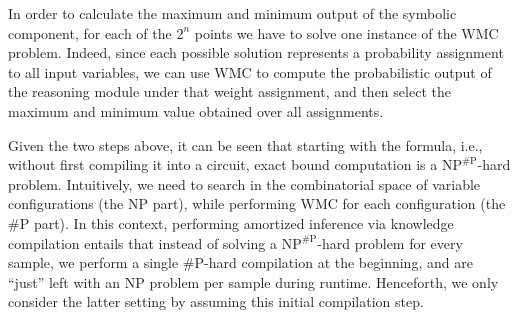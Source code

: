 In order to calculate the maximum and minimum output of the symbolic component, for each of the $2^n$ points we have to solve one instance of the WMC problem. Indeed, since each possible solution represents a probability assignment to all input variables, we can use WMC to compute the probabilistic output of the reasoning module under that weight assignment, and then select the maximum and minimum value obtained over all assignments.

Given the two steps above, it can be seen that starting with the formula, i.e., without first compiling it into a circuit, exact bound computation is a $\mathrm{NP}^{\# \mathrm{P}}$-hard problem. Intuitively, we need to search in the combinatorial space of variable configurations (the $\mathrm{NP}$ part), while performing WMC for each configuration (the $\# \mathrm{P}$ part). In this context, performing amortized inference via knowledge compilation entails that instead of solving a $\mathrm{NP}^{\# \mathrm{P}}$-hard problem for every sample, we perform a single $\# \mathrm{P}$-hard compilation at the beginning, and are ``just'' left with an NP problem per sample during runtime. Henceforth, we only consider the latter setting by assuming this initial compilation step.

